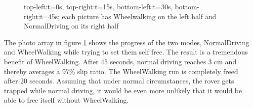 \documentclass[a4paper,twocolumn]{esapub2005} %
\begin{document}
\begin{figure}[h!]
	\centering	
	\caption{top-left:t=0s,  top-right:t=15s, bottom-left:t=30s, bottom-right:t=45s; each picture has Wheelwalking on the left half and NormalDriving on its right half }
	\label{fig:volleysequence}
\end{figure}

The photo array in figure \ref{fig:volleysequence} shows the progress of the two modes, NormalDriving and WheelWalking while trying to set them self free. The result is a tremendous benefit of WheelWalking. After 45 seconds, normal driving reaches 3 cm and thereby averages a 97\% slip ratio. The WheelWalking run is completely freed after 20 seconds. Assuming that under normal circumstances, the rover gets trapped while normal driving, it would be even more unlikely that it would be able to free itself without WheelWalking.
\end{document}
